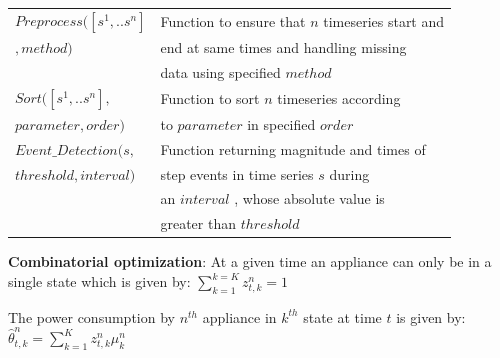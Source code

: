 \documentclass[conference]{IEEEtran}
\begin{document}
\begin{table}
\begin{tabular}{|l|l|}
\hline
$Preprocess([s^1,..s^n]$ & Function to ensure that $n$ timeseries start and\\
$,method)$                                        &end at same times and handling missing\\
                                        & data using specified $method$\\
\hline                                        
$Sort([s^1,..s^n],$ & Function to sort $n$ timeseries according\\
$parameter,order)$  &to $parameter$ in specified $order$\\
\hline
$Event\_Detection(s,$ & Function returning magnitude and times of \\
$threshold,interval)$                  &step events in time series $s$ during \\
                              &an $interval$ , whose absolute value is \\
                              & greater than $threshold$\\
                                                                               

\hline
%
\end{tabular}
\end{table}

\textbf{Combinatorial optimization}:
At a given time an appliance can only be in a single state which is given by:
$\sum\limits_{k=1}^{k=K} z_{t,k}^n=1$

The power consumption by $n^{th}$ appliance in $k^{th}$ state at time $t$ is given by:
$\hat{\theta}^n_{t,k}=\sum\limits_{k=1}^{K} z_{t,k}^n \mu_k^n$
\end{document}
